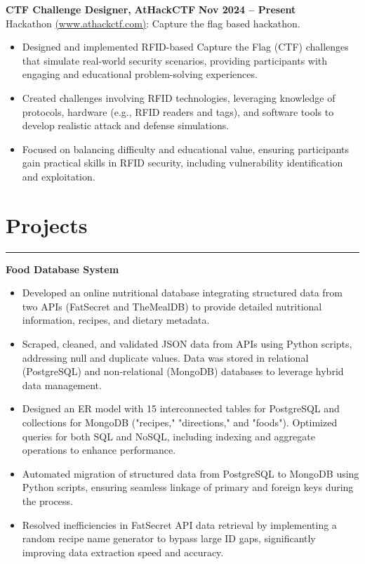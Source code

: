 \documentclass[10pt]{article}
\begin{document}
\textbf{CTF Challenge Designer, } \hfill \textbf{AtHackCTF} \hfill \textbf{Nov 2024 -- Present} \\
{Hackathon {\href{https://www.athackctf.com}{(www.athackctf.com)}: Capture the flag based hackathon.}}
\vspace{-4mm}
\begin{itemize}[left=0.15in, itemsep=0pt]
    \item Designed and implemented RFID-based Capture the Flag (CTF) challenges that simulate real-world security scenarios, providing participants with engaging and educational problem-solving experiences.
    \item Created challenges involving RFID technologies, leveraging knowledge of protocols, hardware (e.g., RFID readers and tags), and software tools to develop realistic attack and defense simulations.
    \item Focused on balancing difficulty and educational value, ensuring participants gain practical skills in RFID security, including vulnerability identification and exploitation.
\end{itemize}

\section*{Projects}
\vspace{-2mm}
\hrule
\vspace{0mm}

\textbf{Food Database System}
\vspace{-4mm}
\begin{itemize}
    \item Developed an online nutritional database integrating structured data from two APIs (FatSecret and TheMealDB) to provide detailed nutritional information, recipes, and dietary metadata.
    \item Scraped, cleaned, and validated JSON data from APIs using Python scripts, addressing null and duplicate values. Data was stored in relational (PostgreSQL) and non-relational (MongoDB) databases to leverage hybrid data management.
    \item Designed an ER model with 15 interconnected tables for PostgreSQL and collections for MongoDB ("recipes," "directions," and "foods"). Optimized queries for both SQL and NoSQL, including indexing and aggregate operations to enhance performance.
    \item Automated migration of structured data from PostgreSQL to MongoDB using Python scripts, ensuring seamless linkage of primary and foreign keys during the process.
    \item Resolved inefficiencies in FatSecret API data retrieval by implementing a random recipe name generator to bypass large ID gaps, significantly improving data extraction speed and accuracy.
\end{itemize}
\end{document}
